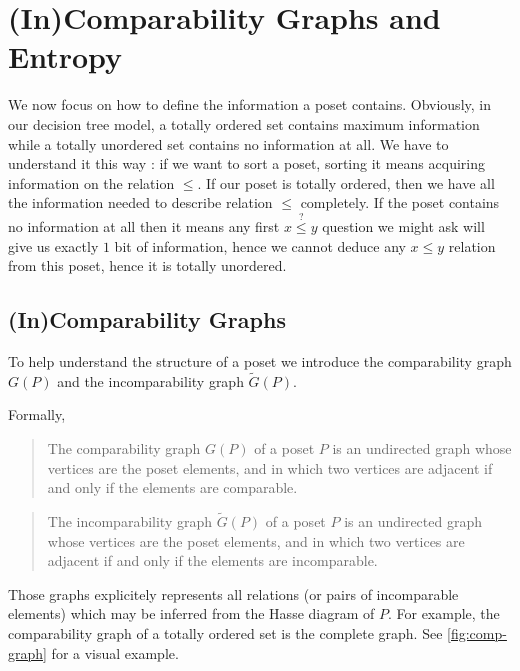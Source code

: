 \section{(In)Comparability Graphs and Entropy}
\label{tree:poset:graph}

We now focus on how to define the information a poset contains. Obviously, in our decision tree model, a totally ordered set contains maximum information while a totally unordered set contains no information at all. We have to understand it this way : if we want to sort a poset, sorting it means acquiring information on the relation $\le$. If our poset is totally ordered, then we have all the information needed to describe relation $\le$ completely. If the poset contains no information at all then it means any first $x \stackrel{?}{\le} y$ question we might ask will give us exactly $1$ bit of information, hence we cannot deduce any $x \le y$ relation from this poset, hence it is totally unordered.

\subsection{(In)Comparability Graphs}

To help understand the structure of a poset we introduce the comparability graph ${G}(P)$ and the incomparability graph $\widetilde{G}(P)$.

Formally,

\begin{quotation}
	The comparability graph ${G}(P)$ of a poset $P$ is an undirected graph whose vertices are the poset elements, and in which two vertices are adjacent if and only if the elements are comparable.
\end{quotation}

\begin{quotation}
	The incomparability graph $\widetilde{G}(P)$ of a poset $P$ is an undirected graph whose vertices are the poset elements, and in which two vertices are adjacent if and only if the elements are incomparable.
\end{quotation}



Those graphs explicitely represents all relations (or pairs of incomparable elements) which may be inferred from the Hasse diagram of ${P}$. For example, the comparability graph of a totally ordered set is the complete graph. See \ref{fig:comp-graph} for a visual example.



